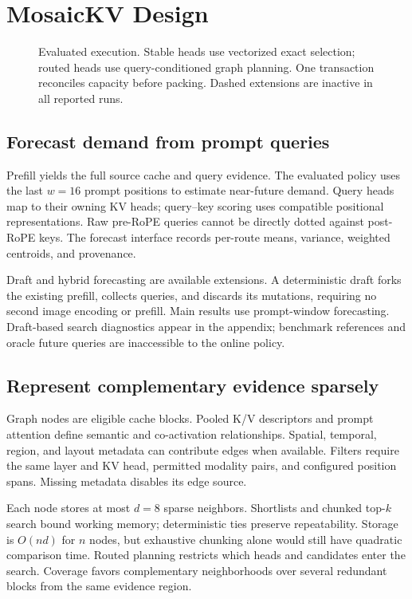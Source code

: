 \section{MosaicKV Design}
\label{sec:design}
\begin{figure}[t]
\centering
\caption{Evaluated execution. Stable heads use vectorized exact selection;
routed heads use query-conditioned graph planning. One transaction reconciles
capacity before packing. Dashed extensions are inactive in all reported runs.}
\label{fig:architecture}
\end{figure}

\subsection{Forecast demand from prompt queries}
Prefill yields the full source cache and query evidence. The evaluated policy
uses the last $w=16$ prompt positions to estimate near-future demand. Query
heads map to their owning KV heads; query--key scoring uses compatible
positional representations. Raw pre-RoPE queries cannot be directly dotted
against post-RoPE keys. The forecast interface records per-route means,
variance, weighted centroids, and provenance.

Draft and hybrid forecasting are available extensions. A deterministic draft
forks the existing prefill, collects queries, and discards its mutations,
requiring no second image encoding or prefill. Main results use prompt-window
forecasting. Draft-based search diagnostics appear in the appendix; benchmark
references and oracle future queries are inaccessible to the online policy.

\subsection{Represent complementary evidence sparsely}
Graph nodes are eligible cache blocks. Pooled K/V descriptors and prompt
attention define semantic and co-activation relationships. Spatial, temporal,
region, and layout metadata can contribute edges when available. Filters
require the same layer and KV head, permitted modality pairs, and configured
position spans. Missing metadata disables its edge source.

Each node stores at most $d=8$ sparse neighbors. Shortlists and chunked top-$k$
search bound working memory; deterministic ties preserve repeatability.
Storage is $O(nd)$ for $n$ nodes, but exhaustive chunking alone would still
have quadratic comparison time. Routed planning restricts which heads and
candidates enter the search. Coverage favors complementary neighborhoods over
several redundant blocks from the same evidence region.

